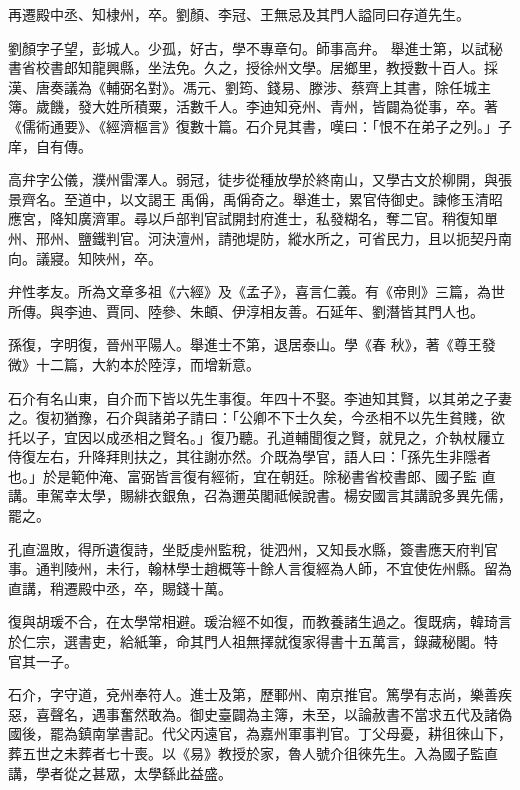 \begin{pinyinscope}
 再遷殿中丞、知棣州，卒。劉顏、李冠、王無忌及其門人謚同曰存道先生。



 劉顏字子望，彭城人。少孤，好古，學不專章句。師事高弁。
 舉進士第，以試秘書省校書郎知龍興縣，坐法免。久之，授徐州文學。居鄉里，教授數十百人。採漢、唐奏議為《輔弼名對》。馮元、劉筠、錢易、滕涉、蔡齊上其書，除任城主簿。歲饑，發大姓所積粟，活數千人。李迪知兗州、青州，皆闢為從事，卒。著《儒術通要》、《經濟樞言》復數十篇。石介見其書，嘆曰：「恨不在弟子之列。」子庠，自有傳。



 高弁字公儀，濮州雷澤人。弱冠，徒步從種放學於終南山，又學古文於柳開，與張景齊名。至道中，以文謁王
 禹偁，禹偁奇之。舉進士，累官侍御史。諫修玉清昭應宮，降知廣濟軍。尋以戶部判官試開封府進士，私發糊名，奪二官。稍復知單州、邢州、鹽鐵判官。河決澶州，請弛堤防，縱水所之，可省民力，且以扼契丹南向。議寢。知陜州，卒。



 弁性孝友。所為文章多祖《六經》及《孟子》，喜言仁義。有《帝則》三篇，為世所傳。與李迪、賈同、陸參、朱頔、伊淳相友善。石延年、劉潛皆其門人也。



 孫復，字明復，晉州平陽人。舉進士不第，退居泰山。學《春
 秋》，著《尊王發微》十二篇，大約本於陸淳，而增新意。



 石介有名山東，自介而下皆以先生事復。年四十不娶。李迪知其賢，以其弟之子妻之。復初猶豫，石介與諸弟子請曰：「公卿不下士久矣，今丞相不以先生貧賤，欲托以子，宜因以成丞相之賢名。」復乃聽。孔道輔聞復之賢，就見之，介執杖屨立侍復左右，升降拜則扶之，其往謝亦然。介既為學官，語人曰：「孫先生非隱者也。」於是範仲淹、富弼皆言復有經術，宜在朝廷。除秘書省校書郎、國子監
 直講。車駕幸太學，賜緋衣銀魚，召為邇英閣祗候說書。楊安國言其講說多異先儒，罷之。



 孔直溫敗，得所遺復詩，坐貶虔州監稅，徙泗州，又知長水縣，簽書應天府判官事。通判陵州，未行，翰林學士趙概等十餘人言復經為人師，不宜使佐州縣。留為直講，稍遷殿中丞，卒，賜錢十萬。



 復與胡瑗不合，在太學常相避。瑗治經不如復，而教養諸生過之。復既病，韓琦言於仁宗，選書吏，給紙筆，命其門人祖無擇就復家得書十五萬言，錄藏秘閣。特
 官其一子。



 石介，字守道，兗州奉符人。進士及第，歷鄆州、南京推官。篤學有志尚，樂善疾惡，喜聲名，遇事奮然敢為。御史臺闢為主簿，未至，以論赦書不當求五代及諸偽國後，罷為鎮南掌書記。代父丙遠官，為嘉州軍事判官。丁父母憂，耕徂徠山下，葬五世之未葬者七十喪。以《易》教授於家，魯人號介徂徠先生。入為國子監直講，學者從之甚眾，太學繇此益盛。




\end{pinyinscope}
